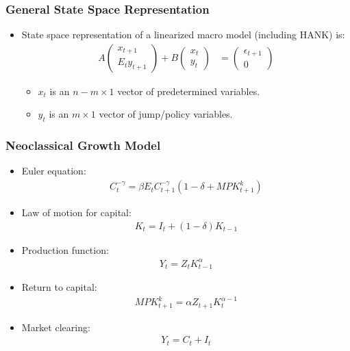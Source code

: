 \documentclass[english,xcolor=svgnames]{beamer}
\begin{document}
\begin{frame}
	\frametitle{General State Space Representation}
	\begin{itemize}
		\item State space representation of a linearized macro model (including HANK) is:
		\begin{align*}
			A \begin{pmatrix} x_{t+1} \\
				E_t y_{t+1}
		\end{pmatrix}
			+ B \begin{pmatrix} x_{t} \\
				y_{t}
		\end{pmatrix} &= \begin{pmatrix} \epsilon_{t+1} \\
			0
	\end{pmatrix}  
		\end{align*}
		\begin{itemize}
			\item $x_t$ is an $n-m\times 1$ vector of predetermined variables.
			\item $y_t$ is an $m\times 1$ vector of jump/policy variables.
		\end{itemize}
	 \end{itemize}
 \end{frame}

 \begin{frame}
	\frametitle{Neoclassical Growth Model}
	\begin{itemize}
		\item Euler equation:
		\begin{align*}
			C_t^{-\gamma}  = \beta E_t C_{t+1}^{-\gamma} (1-\delta+MPK_{t+1}^k)
		\end{align*}
		\item Law of motion for capital:
		\begin{align*}
			K_{t} = I_t + (1-\delta)K_{t-1}
		\end{align*}
		\item Production function:
		\begin{align*}
			Y_t = Z_t K_{t-1}^\alpha
		\end{align*}
		\item Return to capital:
		\begin{align*}
			MPK_{t+1}^k = \alpha Z_{t+1} K_t^{\alpha-1}
		\end{align*}
		\item Market clearing:
		\begin{align*}
			Y_t = C_t + I_t
		\end{align*}
	 \end{itemize}
 \end{frame}
\end{document}

